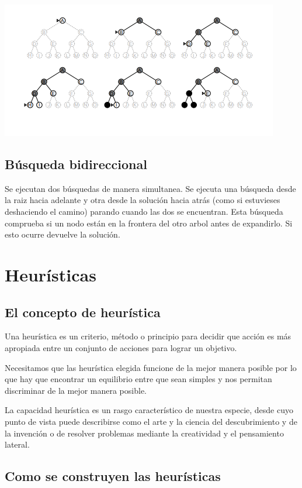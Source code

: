 \documentclass[12pt]{article}
\begin{document}
\includegraphics[width=\textwidth]{profundidad}

\subsection{Búsqueda bidireccional}

Se ejecutan dos búsquedas de manera simultanea. Se ejecuta una
búsqueda desde la raiz hacia adelante y otra desde la solución hacia
atrás (como si estuvieses deshaciendo el camino) parando cuando las
dos se encuentran. Esta búsqueda comprueba si un nodo están en la
frontera del otro arbol antes de expandirlo. Si esto ocurre devuelve
la solución.


\section{Heurísticas}

\subsection{El concepto de heurística}

Una heurística es un criterio, método o principio para decidir que acción
es más apropiada entre un conjunto de acciones para lograr un
objetivo.

Necesitamos que las heurística elegida funcione de la mejor manera
posible por lo que hay que encontrar un equilibrio entre que sean
simples y nos permitan discriminar de la mejor manera posible.

La capacidad heurística es un rasgo característico de nuestra especie,
desde cuyo punto de vista puede describirse como el arte y la ciencia
del descubrimiento y de la invención o de resolver problemas mediante
la creatividad y el pensamiento lateral.

\subsection{Como se construyen las heurísticas}
\end{document}
